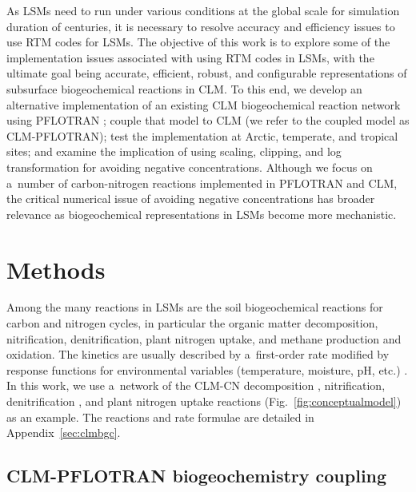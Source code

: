 \documentclass[gmdd, online, hvmath]{copernicus}
\begin{document}
      As LSMs need to run under various conditions at the global scale for
      simulation duration of centuries, it is necessary to resolve accuracy
      and efficiency issues to use RTM codes for LSMs. The objective of this
      work is to explore some of the implementation issues associated with
      using RTM codes in LSMs, with the ultimate goal being accurate,
      efficient, robust, and configurable representations of subsurface
      biogeochemical reactions in CLM. To this end, we develop an
      alternative implementation of an existing CLM biogeochemical reaction
      network using PFLOTRAN \citep{Lichtner2015,Hammond2014}; couple that
      model to CLM (we refer to the coupled model as CLM-PFLOTRAN); test the
      implementation at Arctic, temperate, and tropical sites; and examine
      the implication of using scaling, clipping, and log transformation for
      avoiding negative concentrations.  Although we focus on a~number of
      carbon-nitrogen reactions implemented in PFLOTRAN and CLM, the
      critical numerical issue of avoiding negative concentrations has
      broader relevance as biogeochemical representations in LSMs become
      more mechanistic.



\section{Methods}%

      Among the many reactions in LSMs are the soil biogeochemical reactions
      for carbon and nitrogen cycles, in particular the organic matter
      decomposition, nitrification, denitrification,    plant nitrogen uptake,
      and methane production and oxidation.  The kinetics are usually
      described by a~first-order rate modified by response functions for
      environmental variables (temperature, moisture, pH, etc.)
      \citep{Bonan2012,Boyer2006,Schmidt2011}.  In this work, we use
      a~network of the CLM-CN decomposition
      \citep{Bonan2012,Oleson2013,Thornton2005}, nitrification,
      denitrification \citep{Dickinson2002,Parton2001,Parton1996}, and plant
      nitrogen uptake reactions (Fig.~\ref{fig:conceptualmodel}) as an
      example. The reactions and rate formulae are detailed in
      Appendix~\ref{sec:clmbgc}.


\subsection{CLM-PFLOTRAN biogeochemistry coupling}%
\end{document}

